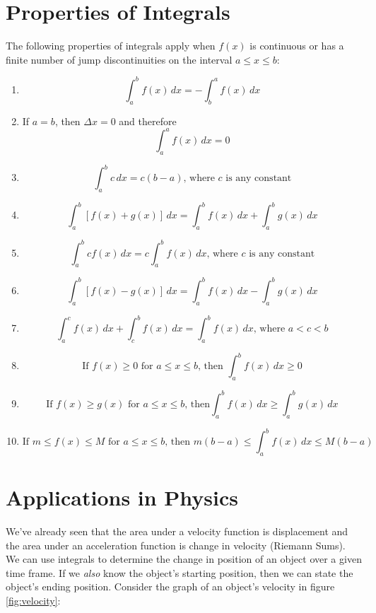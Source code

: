 \section{Properties of Integrals}
The following properties of integrals apply when $f(x)$ is continuous 
or has a finite number of jump discontinuities on the interval $a 
\leq x \leq b$:
\begin{enumerate}
\item $$\int_{a}^{b} f(x)\,dx = - \int_{b}^{a} f(x)\,dx$$ 
\item If $a = b$, then $\Delta x = 0$ and therefore $$\int_{a}^{a} 
f(x)\,dx = 0$$%
\item $$\int_{a}^{b} c\,dx = c (b - a) \text{, where } c 
\text{ is any constant}$$%
\item $$\int_{a}^{b}[f(x) + g(x)]\,dx = \int_{a}^{b} f(x)\,dx + 
\int_{a}^{b} g(x)\,dx$$%
\item $$\int_{a}^{b} c f(x)\,dx = c \int_{a}^{b} f(x)\,dx
\text{, where } c \text{ is any constant}$$%
\item $$\int_{a}^{b}[f(x) - g(x)]\,dx = \int_{a}^{b} f(x)\,dx - 
\int_{a}^{b} g(x)\,dx$$%
\item $$\int_{a}^{c} f(x)\,dx + \int_{c}^{b} f(x)\,dx = 
\int_{a}^{b} f(x)\,dx \text{, where } a < c < b$$%
\item $$\text{If } f(x) \geq 0 \text{ for } a \leq x \leq b 
\text{, then } \int_{a}^{b} f(x)\,dx \geq 0$$%
\item $$\text{If } f(x) \geq g(x) \text{ for } a \leq x \leq b 
\text{, then} \int_{a}^{b} f(x)\,dx \geq \int_{a}^{b} g(x)\,dx$$
\item $$\text{If } m \leq f(x) \leq M \text{ for }a \leq x \leq b 
\text{, then } m (b - a) \leq \int_{a}^{b} f(x)\,dx \leq M (b - a)$$
\end{enumerate}


\section{Applications in Physics}
We've already seen that the area under a velocity function is 
displacement and the area under an acceleration function is change in 
velocity (Riemann Sums). We can use integrals to determine the change 
in position of an object over a given time frame. If we \textit{also} 
know the object's starting position, then we can state the object's 
ending position. Consider the graph of an object's velocity in figure 
\ref{fig:velocity}:

